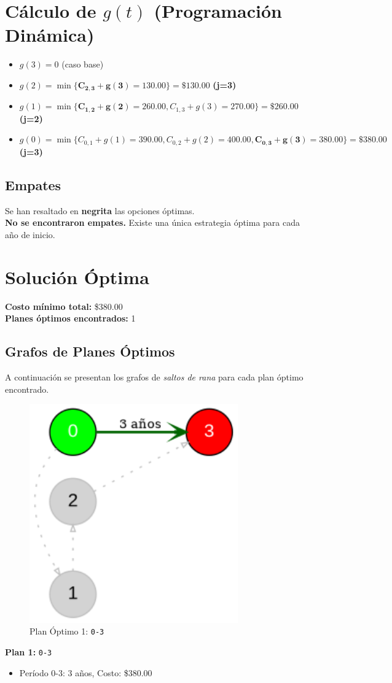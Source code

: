 \documentclass[12pt]{article}
\begin{document}
\clearpage
\section*{Cálculo de $g(t)$ (Programación Dinámica)}
\begin{itemize}
\item $g(3) = 0$ (caso base)
\item $g(2) = \min\{ \mathbf{C_{2,3} + g(3) = 130.00}\} = \$130.00$ \textbf{(j=3)}
\item $g(1) = \min\{ \mathbf{C_{1,2} + g(2) = 260.00}, C_{1,3} + g(3) = 270.00\} = \$260.00$ \textbf{(j=2)}
\item $g(0) = \min\{ C_{0,1} + g(1) = 390.00, C_{0,2} + g(2) = 400.00, \mathbf{C_{0,3} + g(3) = 380.00}\} = \$380.00$ \textbf{(j=3)}
\end{itemize}

\subsection*{Empates}
Se han resaltado en \textbf{negrita} las opciones óptimas.\\
\textbf{No se encontraron empates.} Existe una única estrategia óptima para cada año de inicio.\\
\clearpage
\section*{Solución Óptima}
\textbf{Costo mínimo total:} \$380.00\\
\textbf{Planes óptimos encontrados:} 1
\subsection*{Grafos de Planes Óptimos}
A continuación se presentan los grafos de \emph{saltos de rana} para cada plan óptimo encontrado.

\begin{figure}[H]
\centering
\includegraphics[width=0.8\textwidth]{Reemplazo_bici_plan_1.png}
\caption{Plan Óptimo 1: \texttt{0-3}}
\label{fig:plan1}
\end{figure}

\textbf{Plan 1:} \texttt{0-3}
\begin{itemize}\small
\item Período 0-3: 3 años, Costo: \$380.00
\end{itemize}
\end{document}
